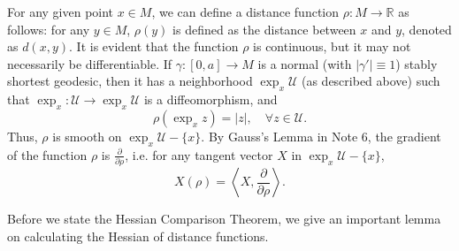 \documentclass{ctexart}
\begin{document}
For any given point $x \in M$, we can define a distance function $\rho: M \rightarrow \mathbb{R}$ as follows: 
for any $y \in M$, $\rho(y)$ is defined as the distance between $x$ and $y$, denoted as $d(x, y)$. It is evident that the function $\rho$ is continuous, but it may not necessarily be differentiable.
If $\gamma:[0, a] \rightarrow M$ is a normal (with $|\gamma'|\equiv 1$) stably shortest geodesic, then it has a neighborhood $\exp _x \mathcal{U}$ (as described above) such that 
$\exp _x: \mathcal{U} \rightarrow \exp _x \mathcal{U}$ is a diffeomorphism, and
$$
\rho\left(\exp _x z\right)=|z|, \quad \forall z \in \mathcal{U} .
$$
Thus, $\rho$ is smooth on $\exp _x \mathcal{U}-\{x\}$. 
By Gauss's Lemma in Note 6, the gradient of the function $\rho$ is $\frac{\partial}{\partial \rho}$, i.e. for any tangent vector $X$ in $\exp _x \mathcal{U}-\{x\}$, 
$$
X (\rho)=\left\langle X, \frac{\partial}{\partial \rho}\right\rangle.
$$  

Before we state the Hessian Comparison Theorem, we give an important lemma on calculating the Hessian of distance functions. 

\end{document}
